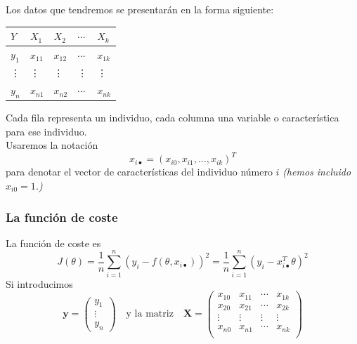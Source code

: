 \documentclass[aspectratio=169]{beamer}
\begin{document}
\begin{frame}
Los datos que tendremos se presentarán en la forma siguiente:
\begin{center}
\begin{tabular}{lllll}
$Y$&$X_1$&$X_2$&$\cdots$&$X_k$\\ \hline
$y_1$&$x_{11}$&$x_{12}$&$\cdots$&$x_{1k}$\\
\vdots&\vdots&\vdots&\vdots&\vdots\\
$y_{n}$&$x_{n1}$&$x_{n2}$&$\cdots$&$x_{nk}$\\
\end{tabular}
\end{center}
Cada fila representa un individuo, cada columna una variable o característica para ese individuo.\\
 Usaremos la notación $$x_{i\bullet}=(x_{i0},x_{i1},\dots,x_{ik})^T$$ para denotar el vector de características del individuo número $i$ \textit{(hemos incluido $x_{i0}=1$.)}

\end{frame}
\begin{frame}\frametitle{La función de coste}
La función de coste es 
$$J(\theta)=\frac 1 n\sum_{i=1}^n\left(y_i-f(\theta,x_{i\bullet})\right)^2=\frac 1 n\sum_{i=1}^n\left(y_i-x_{i\bullet}^T\theta\right)^2$$
Si introducimos
$$\mathbf{y}=\left(\begin{array}{l}
y_1\\\vdots\\y_n  
\end{array}\right) \quad\mbox{y la matriz}\quad \mathbf{X}=\left(
\begin{array}{llll}
x_{10}&x_{11}&\cdots&x_{1k}\\
x_{20}&x_{21}&\cdots&x_{2k}\\
\vdots&\vdots&\vdots&\vdots\\
x_{n0}&x_{n1}&\cdots&x_{nk}\\
\end{array}\right)$$ 
\end{frame}
\end{document}
